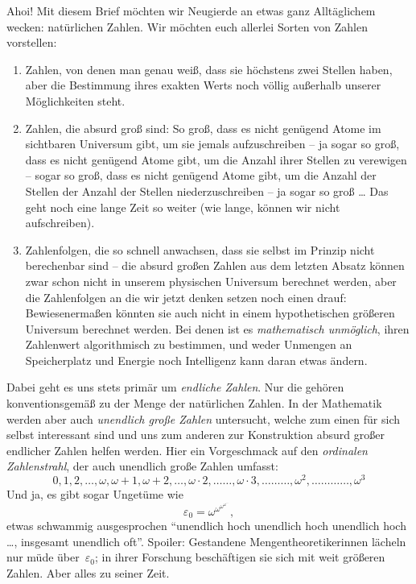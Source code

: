 \documentclass{../../zirkelblatt1718}
\theoremstyle{definition}
\theoremstyle{plain}
\theoremstyle{remark}
\begin{document}

Ahoi! Mit diesem Brief möchten wir Neugierde an etwas ganz Alltäglichem wecken:
natürlichen Zahlen. Wir möchten euch allerlei Sorten von Zahlen vorstellen:

\begin{enumerate}
\item Zahlen, von denen man genau weiß, dass sie höchstens zwei Stellen haben,
aber die Bestimmung ihres exakten Werts noch völlig außerhalb unserer
Möglichkeiten steht.
\item Zahlen, die absurd groß sind: So groß, dass es nicht genügend Atome im
sichtbaren Universum gibt, um sie jemals aufzuschreiben -- ja sogar so groß,
dass es nicht genügend Atome gibt, um die Anzahl ihrer Stellen zu verewigen --
sogar so groß, dass es nicht genügend Atome gibt, um die Anzahl der Stellen der
Anzahl der Stellen niederzuschreiben -- ja sogar so groß \ldots{} Das geht noch
eine lange Zeit so weiter (wie lange, können wir nicht aufschreiben).
\item Zahlenfolgen, die so schnell anwachsen, dass sie selbst im Prinzip nicht
berechenbar sind -- die absurd großen Zahlen aus dem letzten Absatz können zwar
schon nicht in unserem physischen Universum berechnet werden, aber die Zahlenfolgen
an die wir jetzt denken setzen noch einen drauf: Bewiesenermaßen könnten sie
auch nicht in einem hypothetischen größeren Universum berechnet werden. Bei
denen ist es \emph{mathematisch unmöglich}, ihren Zahlenwert algorithmisch zu
bestimmen, und weder Unmengen an Speicherplatz und Energie noch Intelligenz
kann daran etwas ändern.
\end{enumerate}

Dabei geht es uns stets primär um \emph{endliche Zahlen}. Nur die gehören
konventionsgemäß zu der Menge der natürlichen Zahlen. In der Mathematik werden
aber auch \emph{unendlich große Zahlen} untersucht, welche zum einen für sich
selbst interessant sind und uns zum anderen zur Konstruktion absurd großer
endlicher Zahlen helfen werden. Hier ein Vorgeschmack auf den \emph{ordinalen
Zahlenstrahl}, der auch unendlich große Zahlen umfasst:
\[ 0, 1, 2, \ldots, \omega, \omega + 1, \omega + 2, \ldots,
  \omega\cdot2, \ldots\ldots, \omega\cdot3, \ldots\ldots\ldots, \omega^2,
  \ldots\ldots\ldots\ldots, \omega^3
  \]
Und ja, es gibt sogar Ungetüme wie
\[ \varepsilon_0 = \omega^{\omega^{\omega^{\omega^{\ldots}}}}, \]
etwas schwammig ausgesprochen "`unendlich hoch unendlich hoch unendlich hoch
\ldots, insgesamt unendlich oft"'. Spoiler: Gestandene Mengentheoretikerinnen
lächeln nur müde über~$\varepsilon_0$; in ihrer Forschung beschäftigen sie sich
mit weit größeren Zahlen. Aber alles zu seiner Zeit.
\end{document}
